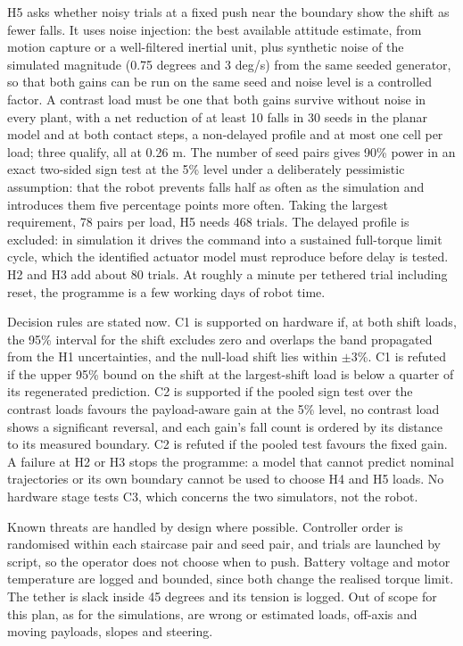 \documentclass[11pt,a4paper]{article}
\begin{document}
H5 asks whether noisy trials at a fixed push near the boundary show the shift as fewer falls. It uses noise injection: the best available attitude estimate, from motion capture or a well-filtered inertial unit, plus synthetic noise of the simulated magnitude (0.75 degrees and 3 deg/s) from the same seeded generator, so that both gains can be run on the same seed and noise level is a controlled factor. A contrast load must be one that both gains survive without noise in every plant, with a net reduction of at least 10 falls in 30 seeds in the planar model and at both contact steps, a non-delayed profile and at most one cell per load; three qualify, all at 0.26 m. The number of seed pairs gives 90\% power in an exact two-sided sign test at the 5\% level under a deliberately pessimistic assumption: that the robot prevents falls half as often as the simulation and introduces them five percentage points more often. Taking the largest requirement, 78 pairs per load, H5 needs 468 trials. The delayed profile is excluded: in simulation it drives the command into a sustained full-torque limit cycle, which the identified actuator model must reproduce before delay is tested. H2 and H3 add about 80 trials. At roughly a minute per tethered trial including reset, the programme is a few working days of robot time.

Decision rules are stated now. C1 is supported on hardware if, at both shift loads, the 95\% interval for the shift excludes zero and overlaps the band propagated from the H1 uncertainties, and the null-load shift lies within \ensuremath{\pm}3\%. C1 is refuted if the upper 95\% bound on the shift at the largest-shift load is below a quarter of its regenerated prediction. C2 is supported if the pooled sign test over the contrast loads favours the payload-aware gain at the 5\% level, no contrast load shows a significant reversal, and each gain's fall count is ordered by its distance to its measured boundary. C2 is refuted if the pooled test favours the fixed gain. A failure at H2 or H3 stops the programme: a model that cannot predict nominal trajectories or its own boundary cannot be used to choose H4 and H5 loads. No hardware stage tests C3, which concerns the two simulators, not the robot.

Known threats are handled by design where possible. Controller order is randomised within each staircase pair and seed pair, and trials are launched by script, so the operator does not choose when to push. Battery voltage and motor temperature are logged and bounded, since both change the realised torque limit. The tether is slack inside 45 degrees and its tension is logged. Out of scope for this plan, as for the simulations, are wrong or estimated loads, off-axis and moving payloads, slopes and steering.
\end{document}
